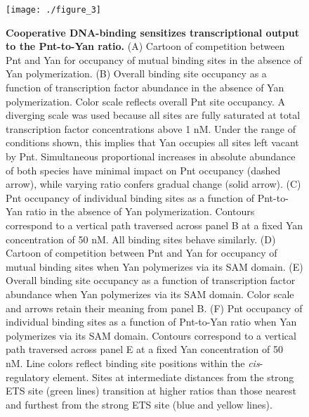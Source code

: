 \begin{figure}[h]
\centering
\texttt{[image: ./figure\_3]}
\caption[Cooperative DNA-binding sensitizes transcriptional output to the Pnt-to-Yan ratio.]{\textbf{Cooperative DNA-binding sensitizes transcriptional output to the Pnt-to-Yan ratio.} (A) Cartoon of competition between Pnt and Yan for occupancy of mutual binding sites in the absence of Yan polymerization. (B) Overall binding site occupancy as a function of transcription factor abundance in the absence of Yan polymerization. Color scale reflects overall Pnt site occupancy. A diverging scale was used because all sites are fully saturated at total transcription factor concentrations above 1 nM. Under the range of conditions shown, this implies that Yan occupies all sites left vacant by Pnt. Simultaneous proportional increases in absolute abundance of both species have minimal impact on Pnt occupancy (dashed arrow), while varying ratio confers gradual change (solid arrow). (C) Pnt occupancy of individual binding sites as a function of Pnt-to-Yan ratio in the absence of Yan polymerization. Contours correspond to a vertical path traversed across panel B at a fixed Yan concentration of 50 nM. All binding sites behave similarly. (D) Cartoon of competition between Pnt and Yan for occupancy of mutual binding sites when Yan polymerizes via its SAM domain. (E) Overall binding site occupancy as a function of transcription factor abundance when Yan polymerizes via its SAM domain. Color scale and arrows retain their meaning from panel B. (F) Pnt occupancy of individual binding sites as a function of Pnt-to-Yan ratio when Yan polymerizes via its SAM domain. Contours correspond to a vertical path traversed across panel E at a fixed Yan concentration of 50 nM. Line colors reflect binding site positions within the \textit{cis}-regulatory element. Sites at intermediate distances from the strong ETS site (green lines) transition at higher ratios than those nearest and furthest from the strong ETS site (blue and yellow lines).}
\label{fig:ch2:fig3}
\end{figure}

